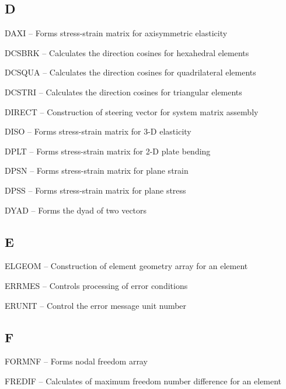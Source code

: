 \subsection*{D} %
\begin{list}{}{\leftmargin=80pt  \itemsep=0pt}
\item[DAXI \hfill]   -- Forms stress-strain matrix for axisymmetric elasticity
\item[DCSBRK \hfill] -- Calculates the direction cosines for hexahedral elements
\item[DCSQUA \hfill] -- Calculates the direction cosines for quadrilateral elements
\item[DCSTRI \hfill] -- Calculates the direction cosines for triangular elements
\item[DIRECT \hfill] -- Construction of steering vector for system matrix assembly
\item[DISO \hfill]   -- Forms stress-strain matrix for 3-D elasticity
\item[DPLT \hfill]   -- Forms stress-strain matrix for 2-D plate bending
\item[DPSN \hfill]   -- Forms stress-strain matrix for plane strain
\item[DPSS \hfill]   -- Forms stress-strain matrix for plane stress
\item[DYAD \hfill]   -- Forms the dyad of two vectors
\end{list}
\subsection*{E} %
\begin{list}{}{\leftmargin=80pt  \itemsep=0pt}
\item[ELGEOM \hfill] -- Construction of element geometry array for an element
\item[ERRMES \hfill] -- Controls processing of error conditions
\item[ERUNIT \hfill] -- Control the error message unit number
\end{list}
\subsection*{F} %
\begin{list}{}{\leftmargin=80pt  \itemsep=0pt}
\item[FORMNF \hfill] -- Forms nodal freedom array
\item[FREDIF \hfill] -- Calculates of maximum freedom number difference for an element
\end{list}
